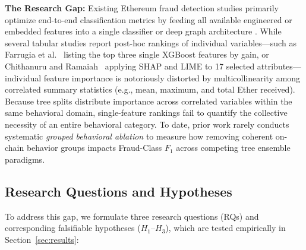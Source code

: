\documentclass[conference]{IEEEtran}
\begin{document}
\textbf{The Research Gap:} Existing Ethereum fraud detection studies primarily optimize end-to-end classification metrics by feeding all available engineered or embedded features into a single classifier \cite{farrugia2020, gu2025} or deep graph architecture \cite{chen2020toit, li2022, zhang2024}. While several tabular studies report post-hoc rankings of individual variables---such as Farrugia et al.~\cite{farrugia2020} listing the top three single XGBoost features by gain, or Chithanuru and Ramaiah~\cite{chithanuru2025} applying SHAP and LIME to 17 selected attributes---individual feature importance is notoriously distorted by multicollinearity among correlated summary statistics (e.g., mean, maximum, and total Ether received). Because tree splits distribute importance across correlated variables within the same behavioral domain, single-feature rankings fail to quantify the collective necessity of an entire behavioral category. To date, prior work rarely conducts systematic \emph{grouped behavioral ablation} to measure how removing coherent on-chain behavior groups impacts Fraud-Class $F_1$ across competing tree ensemble paradigms.

\subsection{Research Questions and Hypotheses}
To address this gap, we formulate three research questions (RQs) and corresponding falsifiable hypotheses ($H_1$--$H_3$), which are tested empirically in Section~\ref{sec:results}:
\end{document}
